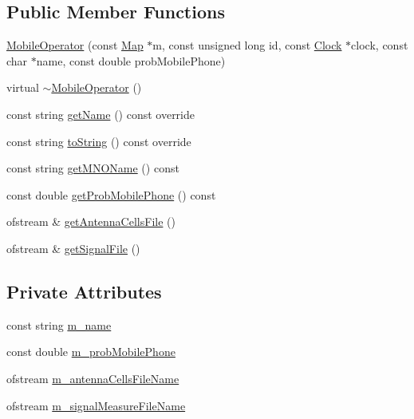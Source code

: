 \subsection*{Public Member Functions}
\begin{DoxyCompactItemize}
\item 
\mbox{\hyperlink{class_mobile_operator_a8a8ad5fccedc56a31118f248f2aa332f}{Mobile\+Operator}} (const \mbox{\hyperlink{class_map}{Map}} $\ast$m, const unsigned long id, const \mbox{\hyperlink{class_clock}{Clock}} $\ast$clock, const char $\ast$name, const double prob\+Mobile\+Phone)
\item 
virtual \mbox{\hyperlink{class_mobile_operator_af77920475ff630755355f67b8f5f2708}{$\sim$\+Mobile\+Operator}} ()
\item 
const string \mbox{\hyperlink{class_mobile_operator_a2b4538d96f7aa898e6e470411d40cbf7}{get\+Name}} () const override
\item 
const string \mbox{\hyperlink{class_mobile_operator_aa83724a149499ef10678ad651a5b40df}{to\+String}} () const override
\item 
const string \mbox{\hyperlink{class_mobile_operator_a003a5d91f543eaf5ff11894bd462ac77}{get\+M\+N\+O\+Name}} () const
\item 
const double \mbox{\hyperlink{class_mobile_operator_afe59edb4ba22cea7fab968fdd1e2ce31}{get\+Prob\+Mobile\+Phone}} () const
\item 
ofstream \& \mbox{\hyperlink{class_mobile_operator_ae6aa3043d946fa97eba7032b9707e52a}{get\+Antenna\+Cells\+File}} ()
\item 
ofstream \& \mbox{\hyperlink{class_mobile_operator_ac39217182fd0ce7ef5da3b9018bcb965}{get\+Signal\+File}} ()
\end{DoxyCompactItemize}
\subsection*{Private Attributes}
\begin{DoxyCompactItemize}
\item 
const string \mbox{\hyperlink{class_mobile_operator_adc9bb6e834adbaf7f85ad7cf9e4c9bec}{m\+\_\+name}}
\item 
const double \mbox{\hyperlink{class_mobile_operator_a4061b50b15ec5499d57ef0e85687c1a2}{m\+\_\+prob\+Mobile\+Phone}}
\item 
ofstream \mbox{\hyperlink{class_mobile_operator_abd11e27d3ed1273be761a55da1549fa4}{m\+\_\+antenna\+Cells\+File\+Name}}
\item 
ofstream \mbox{\hyperlink{class_mobile_operator_af9c02c4088656c0f21ecc93b7023e776}{m\+\_\+signal\+Measure\+File\+Name}}
\end{DoxyCompactItemize}


